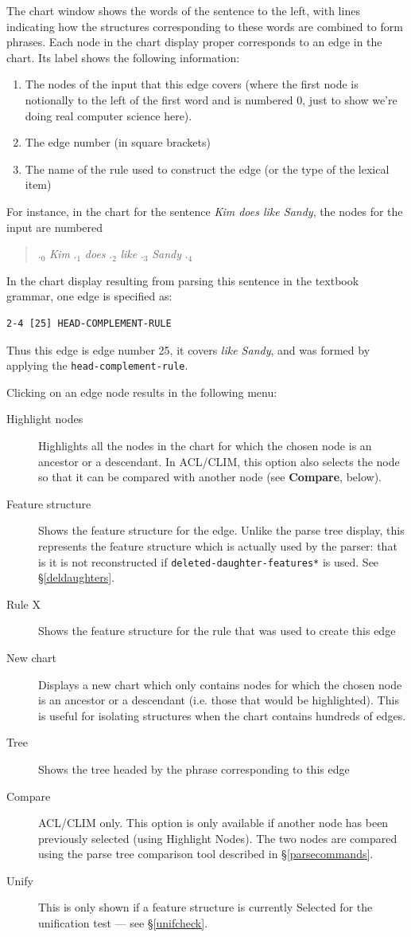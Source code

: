 \documentclass[12pt]{report}
\newcommand{\lkbentryname}[1]{{\tt #1}}
\newcommand{\lkbparam}[1]{{\tt #1}}
\newcommand{\lkbmenucommand}{{\bf}}
\begin{document}
The chart window shows the words of the sentence to the left,
with lines indicating how the structures corresponding to these words
are combined to form phrases.  Each node in the chart display proper
corresponds to an edge in the chart.
Its label shows the following information:
\begin{enumerate}
\item The nodes of the input that this edge covers (where the first node
is notionally to the left of the first word and
is numbered 0, just to show we're doing real computer science here).
\item The edge number (in square brackets)
\item The name of the rule used to construct the edge
(or the type of the lexical item)
\end{enumerate}
For instance, in the chart for the sentence {\it Kim does like Sandy},
the nodes for the input are numbered
\begin{quote}
.$_{0}$ {\it Kim} .$_{1}$ {\it does} .$_{2}$ {\it like} 
.$_{3}$ {\it Sandy} .$_{4}$  
\end{quote}
In the chart display resulting from parsing this sentence 
in the textbook grammar, one edge is specified as:
\begin{verbatim}
2-4 [25] HEAD-COMPLEMENT-RULE
\end{verbatim}
Thus this edge is edge number 25, it covers {\it like Sandy}, 
and was formed by applying the \lkbentryname{head-complement-rule}.

Clicking on an edge node results in the following menu:
\begin{description}
\item[Highlight nodes] Highlights all the nodes
in the chart for which the chosen node is an ancestor or a descendant.
In ACL/CLIM, 
this option also selects the node so that it can be compared with another
node (see {\bf Compare}, below).
\item[Feature structure] Shows the feature structure for the
edge.  Unlike the parse tree display, this represents the feature structure
which is actually used by the parser: that is it is not reconstructed
if \lkbparam{*deleted-daughter-features*} is used.  See \S\ref{deldaughters}.
\item[Rule X]  Shows the feature structure for the rule that was used
to create this edge
\item[New chart] Displays a new chart which only contains nodes
for which the chosen node is an ancestor or a descendant (i.e. those that
would be highlighted).  This is useful for isolating structures
when the chart contains
hundreds of edges.
\item[Tree] Shows the tree headed by the phrase corresponding to
this edge
\item[Compare] ACL/CLIM only.  This option is only
available if another node has been previously 
selected (using {\lkbmenucommand Highlight 
Nodes}).  The two nodes are compared using the parse tree comparison
tool described in \S\ref{parsecommands}.
\item[Unify] This is only shown if a feature structure
is currently {\lkbmenucommand Select}ed for the unification test --- see 
\S\ref{unifcheck}.
\end{description}
\end{document}

